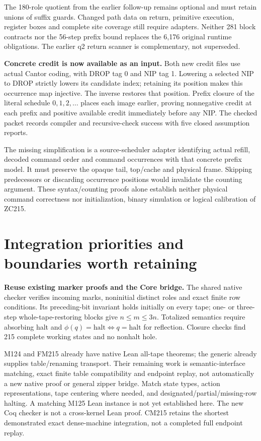 \documentclass[11pt]{article}
\newcommand{\file}[1]{{\small\path{#1}}}
\begin{document}
The 180-role quotient from the earlier follow-up remains optional and must retain unions of suffix guards. Changed path data on return, primitive execution, register boxes and complete site coverage still require adapters. Neither 281 block contracts nor the 56-step prefix bound replaces the 6,176 original runtime obligations. The earlier q2 return scanner is complementary, not superseded.

\textbf{Concrete credit is now available as an input.} Both new credit files use actual Cantor coding, with DROP tag 0 and NIP tag 1. Lowering a selected NIP to DROP strictly lowers its candidate index; retaining its position makes this occurrence map injective. The inverse restores that position. Prefix closure of the literal schedule $0,1,2,\ldots$ places each image earlier, proving nonnegative credit at each prefix and positive available credit immediately before any NIP. The checked packet records compiler and recursive-check success with five closed assumption reports.

The missing simplification is a source-scheduler adapter identifying actual refill, decoded command order and command occurrences with that concrete prefix model. It must preserve the opaque tail, top/cache and physical frame. Skipping predecessors or discarding occurrence positions would invalidate the counting argument. These syntax/counting proofs alone establish neither physical command correctness nor initialization, binary simulation or logical calibration of ZC215.

\newpage
\section{Integration priorities and boundaries worth retaining}
\textbf{Reuse existing marker proofs and the Core bridge.} The shared native checker verifies incoming marks, noninitial distinct roles and exact finite row conditions. Its preceding-bit invariant holds initially on every tape; one- or three-step whole-tape-restoring blocks give $n\le m\le3n$. Totalized semantics require absorbing halt and $\phi(q)=\mathrm{halt}\Leftrightarrow q=\mathrm{halt}$ for reflection. Closure checks find 215 complete working states and no nonhalt hole.

M124 and FM215 already have native Lean all-tape theorems; the generic \file{CoreNativeBridge.blank_iff} already supplies table/renaming transport. Their remaining work is semantic-interface matching, exact finite table compatibility and endpoint replay, not automatically a new native proof or general zipper bridge. Match state types, action representations, tape centering where needed, and designated/partial/missing-row halting. A matching M125 Lean instance is not yet established here. The new Coq checker is not a cross-kernel Lean proof. CM215 retains the shortest demonstrated exact dense-machine integration, not a completed full endpoint replay.
\end{document}
